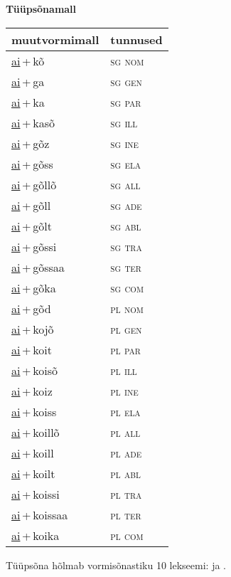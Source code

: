 
\vspace{1.8em}
\begin{minipage}{\textwidth}
\textbf{Tüüpsõnamall \,}\\

\begin{sideways}
\begin{tabular}{l l}
muutvormimall & tunnused \\
\hline
\underline{ai}\,+\,kõ & \textsc{ sg nom } \\
\underline{ai}\,+\,ga & \textsc{ sg gen } \\
\underline{ai}\,+\,ka & \textsc{ sg par } \\
\underline{ai}\,+\,kasõ & \textsc{ sg ill } \\
\underline{ai}\,+\,gõz & \textsc{ sg ine } \\
\underline{ai}\,+\,gõss & \textsc{ sg ela } \\
\underline{ai}\,+\,gõllõ & \textsc{ sg all } \\
\underline{ai}\,+\,gõll & \textsc{ sg ade } \\
\underline{ai}\,+\,gõlt & \textsc{ sg abl } \\
\underline{ai}\,+\,gõssi & \textsc{ sg tra } \\
\underline{ai}\,+\,gõssaa & \textsc{ sg ter } \\
\underline{ai}\,+\,gõka & \textsc{ sg com } \\
\underline{ai}\,+\,gõd & \textsc{ pl nom } \\
\underline{ai}\,+\,kojõ & \textsc{ pl gen } \\
\underline{ai}\,+\,koit & \textsc{ pl par } \\
\underline{ai}\,+\,koisõ & \textsc{ pl ill } \\
\underline{ai}\,+\,koiz & \textsc{ pl ine } \\
\underline{ai}\,+\,koiss & \textsc{ pl ela } \\
\underline{ai}\,+\,koillõ & \textsc{ pl all } \\
\underline{ai}\,+\,koill & \textsc{ pl ade } \\
\underline{ai}\,+\,koilt & \textsc{ pl abl } \\
\underline{ai}\,+\,koissi & \textsc{ pl tra } \\
\underline{ai}\,+\,koissaa & \textsc{ pl ter } \\
\underline{ai}\,+\,koika & \textsc{ pl com } \\
\end{tabular}
\end{sideways}
\label{tab:tüüpsõnamall-aikõ}

\end{minipage}

 
\vspace{1em}
\noindent Tüüpsõna hõlmab vormisõnastiku 10 lekseemi:  ja .
